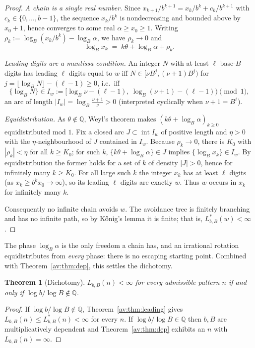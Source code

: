 \documentclass[a4paper]{article}
\theoremstyle{plain}
\newtheorem{theorem}{Theorem}[subsection]
\theoremstyle{definition}
\theoremstyle{remark}
\newcommand{\QQ}{\mathbb{Q}}
\newcommand{\Lbb}[1][b,B]{L_{#1}}
\begin{document}
\begin{proof}
\emph{A chain is a single real number.} Since $x_{k+1}/b^{k+1}=x_k/b^{k}+c_k/b^{k+1}$ with $c_k\in\{0,\dots,b-1\}$, the sequence $x_k/b^{k}$ is nondecreasing and bounded above by $x_0+1$, hence converges to some real $\alpha\ge x_0\ge1$. Writing $\rho_k:=\log_B(x_k/b^{k})-\log_B\alpha$, we have $\rho_k\to0$ and
\[
\log_B x_k \;=\; k\theta+\log_B\alpha+\rho_k .
\]

\emph{Leading digits are a mantissa condition.} An integer $N$ with at least $\ell$ base-$B$ digits has leading $\ell$ digits equal to $w$ iff $N\in[\nu B^{j},(\nu+1)B^{j})$ for $j=\lfloor\log_B N\rfloor-(\ell-1)\ge0$, i.e.\ iff
\[
\{\log_B N\}\in I_w:=\bigl[\log_B\nu-(\ell-1),\ \log_B(\nu+1)-(\ell-1)\bigr)\pmod1,
\]
an arc of length $|I_w|=\log_B\frac{\nu+1}{\nu}>0$ (interpreted cyclically when $\nu+1=B^{\ell}$).

\emph{Equidistribution.} As $\theta\notin\QQ$, Weyl's theorem makes $(k\theta+\log_B\alpha)_{k\ge0}$ equidistributed mod $1$. Fix a closed arc $J\subset\operatorname{int}I_w$ of positive length and $\eta>0$ with the $\eta$-neighbourhood of $J$ contained in $I_w$. Because $\rho_k\to0$, there is $K_0$ with $|\rho_k|<\eta$ for all $k\ge K_0$; for such $k$, $\{k\theta+\log_B\alpha\}\in J$ implies $\{\log_B x_k\}\in I_w$. By equidistribution the former holds for a set of $k$ of density $|J|>0$, hence for infinitely many $k\ge K_0$. For all large such $k$ the integer $x_k$ has at least $\ell$ digits (as $x_k\ge b^{k}x_0\to\infty$), so its leading $\ell$ digits are exactly $w$. Thus $w$ occurs in $x_k$ for infinitely many $k$.

Consequently no infinite chain avoids $w$. The avoidance tree is finitely branching and has no infinite path, so by K\H{o}nig's lemma it is finite; that is, $L^{*}_{b,B}(w)<\infty$.
\end{proof}

The phase $\log_B\alpha$ is the only freedom a chain has, and an irrational rotation equidistributes from \emph{every} phase: there is no escaping starting point. Combined with Theorem~\ref{av:thm:dep}, this settles the dichotomy.

\begin{theorem}[Dichotomy]\label{av:thm:dichotomy}
$\Lbb(n)<\infty$ for every admissible pattern $n$ \emph{if and only if} $\log b/\log B\notin\QQ$.
\end{theorem}

\begin{proof}
If $\log b/\log B\notin\QQ$, Theorem~\ref{av:thm:leading} gives $\Lbb(n)\le L^{*}_{b,B}(n)<\infty$ for every $n$. If $\log b/\log B\in\QQ$ then $b,B$ are multiplicatively dependent and Theorem~\ref{av:thm:dep} exhibits an $n$ with $\Lbb(n)=\infty$.
\end{proof}
\end{document}
